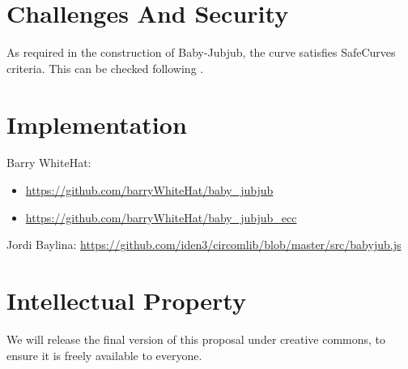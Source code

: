 \documentclass{article}
\begin{document}
\begin{spacing}{1.2}
\section{Challenges And Security}
	As required in the construction of Baby-Jubjub, the curve satisfies SafeCurves criteria. This can be checked following \cite{github-barry}.
	
\section{Implementation}	
	Barry WhiteHat:	
	\begin{itemize}
		\item %
		\url{https://github.com/barryWhiteHat/baby_jubjub}
		\item %
		\url{https://github.com/barryWhiteHat/baby_jubjub_ecc} 
	\end{itemize}
	Jordi Baylina: \url{https://github.com/iden3/circomlib/blob/master/src/babyjub.js}

\section {Intellectual Property}

	We will release the final version of this proposal under creative commons, to ensure it is freely available to everyone.


	
	
\end{spacing}	
\end{document}
